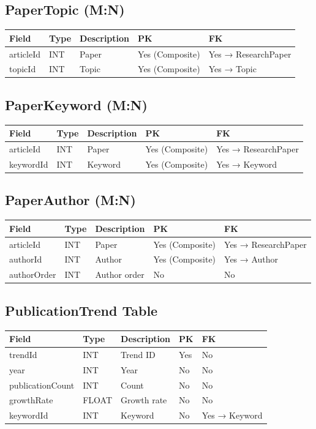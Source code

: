 \documentclass[12pt,a4paper]{article}
\begin{document}
{{\subsection{PaperTopic (M:N)}
\begin{longtable}{|p{3cm}|p{3cm}|p{6cm}|p{1.5cm}|p{1.5cm}|}
	\hline
	Field & Type & Description & PK & FK \\
	\hline
	articleId & INT & Paper & Yes (Composite) & Yes → ResearchPaper \\
	topicId & INT & Topic & Yes (Composite) & Yes → Topic \\
	\hline
\end{longtable}

\subsection{PaperKeyword (M:N)}
\begin{longtable}{|p{3cm}|p{3cm}|p{6cm}|p{1.5cm}|p{1.5cm}|}
	\hline
	Field & Type & Description & PK & FK \\
	\hline
	articleId & INT & Paper & Yes (Composite) & Yes → ResearchPaper \\
	keywordId & INT & Keyword & Yes (Composite) & Yes → Keyword \\
	\hline
\end{longtable}

\subsection{PaperAuthor (M:N)}
\begin{longtable}{|p{3cm}|p{3cm}|p{6cm}|p{1.5cm}|p{1.5cm}|}
	\hline
	Field & Type & Description & PK & FK \\
	\hline
	articleId & INT & Paper & Yes (Composite) & Yes → ResearchPaper \\
	authorId & INT & Author & Yes (Composite) & Yes → Author \\
	authorOrder & INT & Author order & No & No \\
	\hline
\end{longtable}

\subsection{PublicationTrend Table}
\begin{longtable}{|p{3cm}|p{3cm}|p{6cm}|p{1.5cm}|p{1.5cm}|}
	\hline
	Field & Type & Description & PK & FK \\
	\hline
	trendId & INT & Trend ID & Yes & No \\
	year & INT & Year & No & No \\
	publicationCount & INT & Count & No & No \\
	growthRate & FLOAT & Growth rate & No & No \\
	keywordId & INT & Keyword & No & Yes → Keyword \\
	\hline
\end{longtable}

}}
\end{document}
